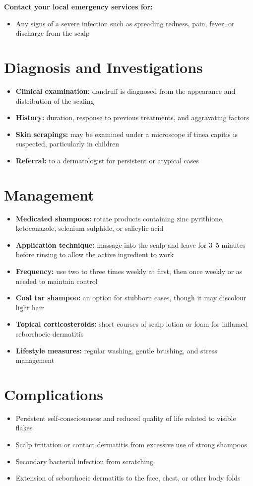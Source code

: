 \textbf{Contact your local emergency services for:}
\begin{itemize}
    \item Any signs of a severe infection such as spreading redness, pain, fever, or discharge from the scalp
\end{itemize}

\section*{Diagnosis and Investigations}
\begin{itemize}
    \item \textbf{Clinical examination:} dandruff is diagnosed from the appearance and distribution of the scaling
    \item \textbf{History:} duration, response to previous treatments, and aggravating factors
    \item \textbf{Skin scrapings:} may be examined under a microscope if tinea capitis is suspected, particularly in children
    \item \textbf{Referral:} to a dermatologist for persistent or atypical cases
\end{itemize}

\section*{Management}
\begin{itemize}
    \item \textbf{Medicated shampoos:} rotate products containing zinc pyrithione, ketoconazole, selenium sulphide, or salicylic acid
    \item \textbf{Application technique:} massage into the scalp and leave for 3--5 minutes before rinsing to allow the active ingredient to work
    \item \textbf{Frequency:} use two to three times weekly at first, then once weekly or as needed to maintain control
    \item \textbf{Coal tar shampoo:} an option for stubborn cases, though it may discolour light hair
    \item \textbf{Topical corticosteroids:} short courses of scalp lotion or foam for inflamed seborrhoeic dermatitis
    \item \textbf{Lifestyle measures:} regular washing, gentle brushing, and stress management
\end{itemize}

\section*{Complications}
\begin{itemize}
    \item Persistent self-consciousness and reduced quality of life related to visible flakes
    \item Scalp irritation or contact dermatitis from excessive use of strong shampoos
    \item Secondary bacterial infection from scratching
    \item Extension of seborrhoeic dermatitis to the face, chest, or other body folds
\end{itemize}

